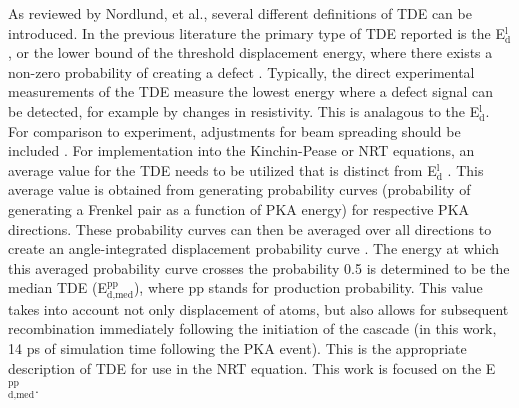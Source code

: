 \documentclass[review]{elsarticle}
\providecommand{\DIFaddend}{} %
\DeclareRobustCommand{\DIFaddend}{\DIFOaddend \let\includegraphics\DIFOincludegraphics} %
\begin{document}
\DIFaddend As reviewed by Nordlund, et al.\cite{nordlund2006}, several different definitions of TDE can be introduced. In the previous literature the primary type of TDE reported is the E$^{\textrm{l}}_{\textrm{d}}$, or the lower bound of the threshold displacement energy, where there exists a non-zero probability of creating a defect \cite{malerba2002}. Typically, the direct experimental measurements of the TDE measure the lowest energy where a defect signal can be detected, for example by changes in resistivity. This is analagous to the E$^{\textrm{l}}_{\textrm{d}}$. For comparison to experiment, adjustments for beam spreading should be included \cite{nordlund2006}. For implementation into the Kinchin-Pease or NRT equations, an average value for the TDE needs to be utilized that is distinct from E$^{\textrm{l}}_{\textrm{d}}$ \cite{nordlund2006,norgett1975}. This average value is obtained from generating probability curves (probability of generating a Frenkel pair as a function of PKA energy) for respective PKA directions. These probability curves can then be averaged over all directions to create an angle-integrated displacement probability curve \cite{nordlund2006}. The energy at which this averaged probability curve crosses the probability 0.5 is determined to be the median TDE (E$^{\textrm{pp}}_{\textrm{d,med}}$), where pp stands for production probability. This value takes into account not only displacement of atoms, but also allows for subsequent recombination immediately following the initiation of the cascade (in this work, 14 ps of simulation time following the PKA event). This is the appropriate description of TDE for use in the NRT equation. This work is focused on the E$^{\textrm{pp}}_{\textrm{d,med}}$.
\end{document}
